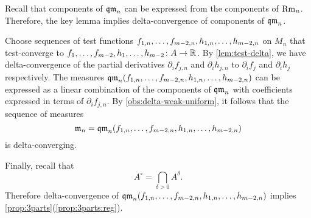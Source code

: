 Recall that components of $\operatorname{\mathfrak{qm}}_n$ can be expressed from the components of $\operatorname{\rm Rm}_n$.
Therefore, the key lemma implies delta-convergence of components of $\operatorname{\mathfrak{qm}}_n$.

Choose sequences of test functions $f_{1,n},\zz\dots,f_{m-2,n},h_{1,n},\zz\dots,h_{m-2,n}$ on $M_n$ that test-converge to $f_{1},\zz\dots,f_{m-2},h_{1},\zz\dots,h_{m-2}\:A\to \RR$.
By \ref{lem:test-delta}, we have delta-convergence of the partial derivatives $\partial_if_{j,n}$ and 
$\partial_ih_{j,n}$ to $\partial_if_{j}$ and 
$\partial_ih_{j}$ respectively.
The measures $\qm_n(f_{1,n},\zz\dots,f_{m-2,n},\zz{}h_{1,n},\zz\dots,h_{m-2,n})$ 
can be expressed as a linear combination of the components of $\operatorname{\mathfrak{qm}}_n$ with coefficients expressed in terms of $\partial_if_{j,n}$.
By \ref{obs:delta-weak-uniform}, it follows that the sequence of measures 
\[\mathfrak m_n=\qm_n(f_{1,n},\dots,f_{m-2,n},h_{1,n},\zz\dots,h_{m-2,n})\]
is delta-converging.

Finally, recall that 
\[A^\circ=\bigcap_{\delta>0}A^\delta.\]
Therefore delta-convergence of $\qm_n(f_{1,n},\dots,f_{m-2,n},h_{1,n},\zz\dots,h_{m-2,n})$ implies \ref{prop:3parts}(\ref{prop:3parts:reg}).
\qeds
